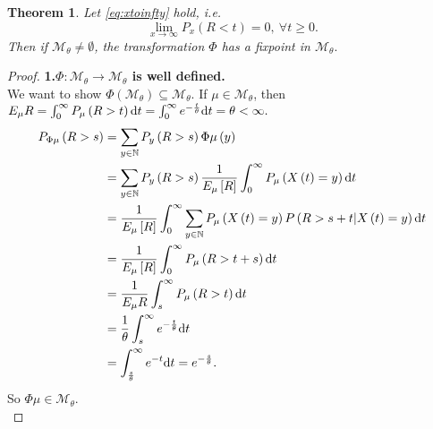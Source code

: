 \documentclass[12pt,a4paper]{scrartcl}
\newtheorem{theorem}{Theorem}[section]
\numberwithin{equation}{section}
\newcommand{\N}{\mathbb{N}} %
\begin{document}
\begin{theorem} \label{th:mthetacontainsfixpoint} Let \eqref{eq:xtoinfty} hold, i.e.
\begin{equation*}
\lim_{ x \to \infty} {P_{x}\left(R < t\right)} = 0 , \ \forall t \geq 0.
\end{equation*}
Then if $\mathcal{M}_{\theta} \neq \emptyset$, the transformation $\Phi$ has a fixpoint in $\mathcal{M}_{\theta}.$
\end{theorem}

\begin{proof}
\textbf{1.$\Phi:\mathcal{M}_{\theta} \to \mathcal{M}_{\theta}$ is well defined.} \\

We want to show $\Phi\left(\mathcal{M}_{\theta}\right) \subseteq \mathcal{M}_{\theta}.$ If $ \mu \in \mathcal{M}_{\theta} $, then $ E_{\mu} R = \int_0^{\infty} P_{\mu}\left(R > t\right) \textnormal{d}t = \int_0^{\infty} e^{-\frac{t}{\theta}} \textnormal{d}t = \theta < \infty.$  
\begin{align*}
P_{\Phi\mu}\left(R>s\right) &= \sum_{y \in \N} P_y\left(R > s \right) \Phi\mu\left(y\right)  \\
&= \sum_{y \in \N} P_y\left(R > s \right) \frac{1}{E_{\mu}\left[R\right]} \int_0^\infty P_{\mu}\left(X\left(t\right) = y\right) \textnormal{d}t \\
&= \frac{1}{E_{\mu}\left[R\right]} \int_0^\infty \sum_{y \in \N} P_{\mu}\left(X\left(t\right) = y\right) P\left(R > s + t | X\left(t\right) = y \right) \textnormal{d}t \\
&= \frac{1}{E_{\mu}\left[R\right]} \int_0^\infty P_{\mu}\left(R > t+s\right) \textnormal{d}t \\
&= \frac{1}{E_{\mu} R} \int_s^{\infty} P_{\mu}\left(R > t\right) \textnormal{d}t \\
&= \frac{1}{\theta} \int_s^{\infty} e^{-\frac{t}{\theta}} \textnormal{d}t \\
&= \int_{\frac{s}{\theta}}^{\infty} e^{-t} \textnormal{d}t = e^{-\frac{s}{\theta}}.
\end{align*}
So $\Phi\mu \in \mathcal{M}_{\theta}.$ \\[2ex]


\end{proof}
\end{document}
